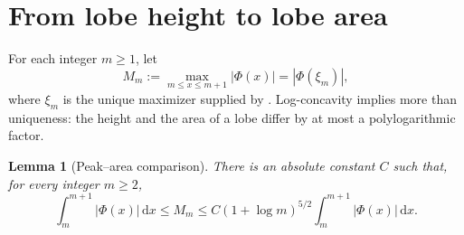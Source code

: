 \documentclass[11pt,oneside]{article}
\numberwithin{equation}{section}
\newtheorem{lemma}[theorem]{Lemma}
\theoremstyle{definition}
\theoremstyle{remark}
\newcommand{\dd}{\,\mathrm d}
\newcommand{\abs}[1]{\left|#1\right|}
\newcommand{\PhiUp}{\Phi}
\newcommand{\defeq}{\mathrel{:=}}
\begin{document}
\section{From lobe height to lobe area}
\label{sec:peak-area}

For each integer \(m\ge1\), let
\begin{equation}
 M_m\defeq\max_{m\le x\le m+1}\abs{\PhiUp(x)}
 =\abs{\PhiUp(\xi_m)},
 \label{eq:lobe-height}
\end{equation}
where \(\xi_m\) is the unique maximizer supplied by
.  Log-concavity implies more than uniqueness: the height and the
area of a lobe differ by at most a polylogarithmic factor.

\begin{lemma}[Peak--area comparison]
\label{lem:peak-area}
There is an absolute constant \(C\) such that, for every integer \(m\ge2\),
\begin{equation}
 \int_m^{m+1}\abs{\PhiUp(x)}\dd x
 \le M_m
 \le C(1+\log m)^{5/2}
       \int_m^{m+1}\abs{\PhiUp(x)}\dd x.
 \label{eq:peak-area}
\end{equation}
\end{lemma}
\end{document}
